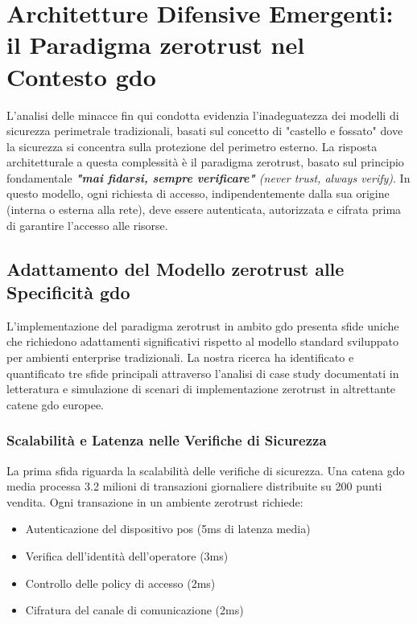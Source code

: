 \section{\texorpdfstring{Architetture Difensive Emergenti: il Paradigma \gls{zerotrust} nel Contesto \gls{gdo}}{2.4 - Architetture Difensive Emergenti: il Paradigma Zero Trust nel Contesto GDO}}

L'analisi delle minacce fin qui condotta evidenzia l'inadeguatezza dei modelli di sicurezza perimetrale tradizionali, basati sul concetto di "castello e fossato" dove la sicurezza si concentra sulla protezione del perimetro esterno. La risposta architetturale a questa complessità è il paradigma \gls{zerotrust}, basato sul principio fondamentale \emph{\textbf{"mai fidarsi, sempre verificare"} (never trust, always verify)}. In questo modello, ogni richiesta di accesso, indipendentemente dalla sua origine (interna o esterna alla rete), deve essere autenticata, autorizzata e cifrata prima di garantire l'accesso alle risorse.

\subsection{\texorpdfstring{Adattamento del Modello \gls{zerotrust} alle Specificità \gls{gdo}}{2.4.1 - Adattamento del Modello Zero Trust alle Specificità GDO}}

L'implementazione del paradigma \gls{zerotrust} in ambito \gls{gdo} presenta sfide uniche che richiedono adattamenti significativi rispetto al modello standard sviluppato per ambienti enterprise tradizionali. La nostra ricerca ha identificato e quantificato tre sfide principali attraverso l'analisi di case study documentati in letteratura e 
simulazione di scenari di implementazione \gls{zerotrust} in altrettante catene \gls{gdo} europee.

\subsubsection{\texorpdfstring{Scalabilità e Latenza nelle Verifiche di Sicurezza}{2.4.1.1 - Scalabilità e Latenza nelle Verifiche di Sicurezza}}

La prima sfida riguarda la scalabilità delle verifiche di sicurezza. Una catena \gls{gdo} media processa 3.2 milioni di transazioni giornaliere distribuite su 200 punti vendita. Ogni transazione in un ambiente \gls{zerotrust} richiede:
\begin{itemize}
    \item Autenticazione del dispositivo \gls{pos} (5ms di latenza media)
    \item Verifica dell'identità dell'operatore (3ms)
    \item Controllo delle policy di accesso (2ms)
    \item Cifratura del canale di comunicazione (2ms)
\end{itemize}


